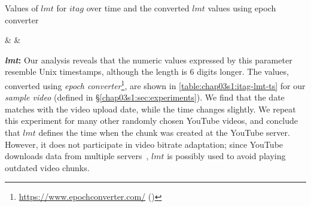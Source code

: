 \begin{table}[!t]
 \small
\caption{\small{Values of $lmt$ for $itag$ over time and the converted $lmt$ values using epoch converter}}
\label{table:chap03s1:itag-lmt-ts}
 \centering
{\csvcoli & \csvcolii & \csvcoliii}%
\end{table}


{\bf {\em lmt}:} Our analysis reveals that the numeric values expressed by this parameter resemble Unix timestamps, although the length is $6$ digits longer.
The values, converted using {\em epoch converter}\footnote{\url{https://www.epochconverter.com/} (\lastaccessedtoday)}, are shown in \tbl\ref{table:chap03s1:itag-lmt-ts} for our {\it sample video} (defined in \S\ref{chap03s1:sec:experiments}).
We find that the date matches with the video upload date, while the time changes slightly.
We repeat this experiment for many other randomly chosen YouTube videos, and conclude that $lmt$ defines the time when the chunk was created at the YouTube server.
However, it does not participate in video bitrate adaptation; since YouTube downloads data from multiple servers~\cite{krishnappa2013dashing}, $lmt$ is possibly used to avoid playing outdated video chunks.

